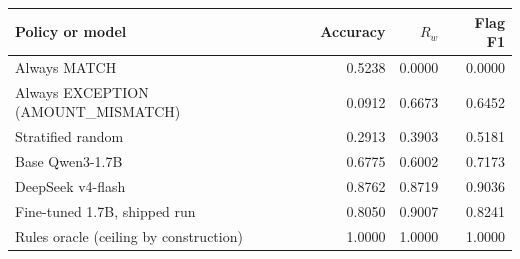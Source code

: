 \begin{tabular}{@{}lrrr@{}}
\toprule
Policy or model & Accuracy & $R_w$ & Flag F1 \\
\midrule
Always MATCH & 0.5238 & 0.0000 & 0.0000 \\
Always EXCEPTION (AMOUNT\_MISMATCH) & 0.0912 & 0.6673 & 0.6452 \\
Stratified random & 0.2913 & 0.3903 & 0.5181 \\
Base Qwen3-1.7B & 0.6775 & 0.6002 & 0.7173 \\
DeepSeek v4-flash & 0.8762 & 0.8719 & 0.9036 \\
Fine-tuned 1.7B, shipped run & 0.8050 & 0.9007 & 0.8241 \\
Rules oracle (ceiling by construction) & 1.0000 & 1.0000 & 1.0000 \\
\bottomrule
\end{tabular}
